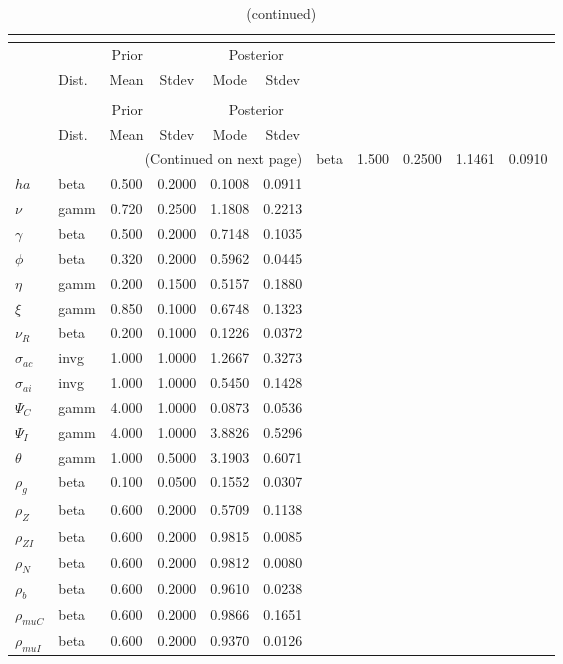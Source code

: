  
\begin{center}
\begin{longtable}{llcccc} 
\caption{Results from posterior maximization (parameters)}\\
 \label{Table:Posterior:1}\\
\toprule 
  & \multicolumn{3}{c}{Prior}  &  \multicolumn{2}{c}{Posterior} \\
  \cmidrule(r{.75em}){2-4} \cmidrule(r{.75em}){5-6}
  & Dist. & Mean  & Stdev & Mode & Stdev \\ 
\midrule \endfirsthead 
\caption{(continued)}\\
 \bottomrule 
  & \multicolumn{3}{c}{Prior}  &  \multicolumn{2}{c}{Posterior} \\
  \cmidrule(r{.75em}){2-4} \cmidrule(r{.75em}){5-6}
  & Dist. & Mean  & Stdev & Mode & Stdev \\ 
\midrule \endhead 
\bottomrule \multicolumn{6}{r}{(Continued on next page)}\endfoot 
\bottomrule\endlastfoot 
${\sigma}$ & beta &   1.500 & 0.2500 &   1.1461 &  0.0910 \\ 
${ha}$ & beta &   0.500 & 0.2000 &   0.1008 &  0.0911 \\ 
$\nu$ & gamm &   0.720 & 0.2500 &   1.1808 &  0.2213 \\ 
$\gamma$ & beta &   0.500 & 0.2000 &   0.7148 &  0.1035 \\ 
${\phi}$ & beta &   0.320 & 0.2000 &   0.5962 &  0.0445 \\ 
${\eta}$ & gamm &   0.200 & 0.1500 &   0.5157 &  0.1880 \\ 
$\xi$ & gamm &   0.850 & 0.1000 &   0.6748 &  0.1323 \\ 
${\nu_R}$ & beta &   0.200 & 0.1000 &   0.1226 &  0.0372 \\ 
${\sigma_{ac}}$ & invg &   1.000 & 1.0000 &   1.2667 &  0.3273 \\ 
${\sigma_{ai}}$ & invg &   1.000 & 1.0000 &   0.5450 &  0.1428 \\ 
${\Psi_{C}}$ & gamm &   4.000 & 1.0000 &   0.0873 &  0.0536 \\ 
${\Psi_I}$ & gamm &   4.000 & 1.0000 &   3.8826 &  0.5296 \\ 
${\theta}$ & gamm &   1.000 & 0.5000 &   3.1903 &  0.6071 \\ 
${\rho_g}$ & beta &   0.100 & 0.0500 &   0.1552 &  0.0307 \\ 
${\rho_Z}$ & beta &   0.600 & 0.2000 &   0.5709 &  0.1138 \\ 
${\rho_{ZI}}$ & beta &   0.600 & 0.2000 &   0.9815 &  0.0085 \\ 
${\rho_N}$ & beta &   0.600 & 0.2000 &   0.9812 &  0.0080 \\ 
${\rho_b}$ & beta &   0.600 & 0.2000 &   0.9610 &  0.0238 \\ 
${\rho_{muC}}$ & beta &   0.600 & 0.2000 &   0.9866 &  0.1651 \\ 
${\rho_{muI}}$ & beta &   0.600 & 0.2000 &   0.9370 &  0.0126 \\ 
\end{longtable}
 \end{center}
